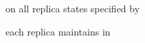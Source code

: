\begin{frame}{}
  \begin{center}
    {\large {} on all replica states specified by \blue{\wlspec{}}}

    \vspace{0.20cm}
    \vspace{0.20cm}

    {\large {} each replica maintains in }
  \end{center}
\end{frame}
